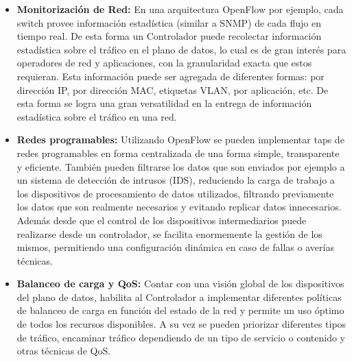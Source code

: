 \begin{itemize}

\item \textbf{Monitorizaci\'on de Red:}
En una arquitectura OpenFlow por ejemplo, cada switch provee información estadística (similar a SNMP) de cada flujo en tiempo real. De esta forma un Controlador puede recolectar información estadística sobre el tráfico en el plano de datos, lo cual es de gran interés para operadores de red y aplicaciones, con la granularidad exacta que estos requieran. Esta información puede ser agregada de diferentes formas: por dirección IP, por dirección MAC, etiquetas VLAN, por aplicación, etc. De esta forma se logra una gran versatilidad en la entrega de información estadística sobre el tráfico en una red.

\item \textbf{Redes  programables:}
Utilizando OpenFlow se pueden implementar taps de redes programables en forma centralizada de una forma simple, transparente y eficiente. También pueden filtrarse los datos que son enviados por ejemplo a un sistema de detección de intrusos (IDS), reduciendo la carga de trabajo a los dispositivos de procesamiento de datos utilizados, filtrando previamente los datos que son realmente necesarios y evitando replicar datos innecesarios.\\
Además desde que el control de los dispositivos intermediarios puede realizarse desde un controlador, se facilita enormemente la gestión de los mismos, permitiendo una configuración dinámica en caso de fallas o averías técnicas.


\item \textbf{Balanceo de carga y QoS:}
Contar con una visión global de los dispositivos del plano de datos, habilita al Controlador a implementar diferentes políticas de balanceo de carga en función del estado de la red y permite un uso óptimo de todos los recursos disponibles. A su vez se pueden priorizar diferentes tipos de tráfico, encaminar tráfico dependiendo de un tipo de servicio o contenido y otras técnicas de QoS.


\end{itemize}
